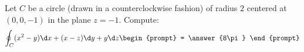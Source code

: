 \documentclass{ximera}
\author{Bart Snapp}
\begin{document}
\begin{exercise}
  Let $C$ be a circle (drawn in a counterclockwise fashion) of radius
  $2$ centered at $(0,0,-1)$ in the plane $z = -1$.  Compute:
  \[
  \oint_C (x^2-y) \d x + (x-z)\d y + y \d z
  \begin{prompt}
    = \answer{8\pi}
  \end{prompt}
  \]
\end{exercise}
\end{document}
